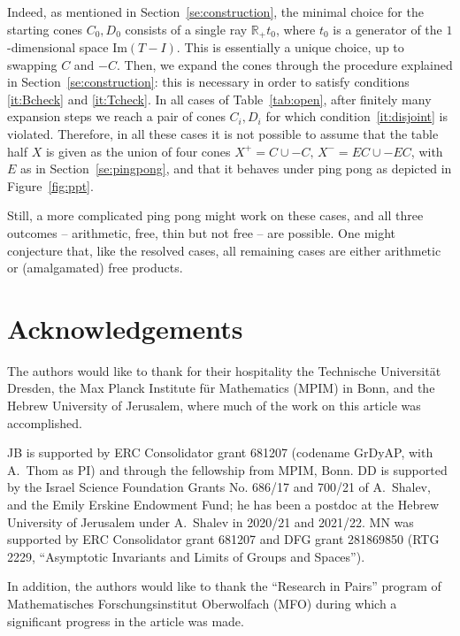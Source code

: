 \documentclass[11pt,a4paper]{amsart}
\theoremstyle{definition}
\theoremstyle{definition}
\numberwithin{equation}{section}
\begin{document}
Indeed, as mentioned in Section~\ref{se:construction}, the minimal choice for the starting cones $C_{0},D_{0}$ consists of a single ray $\mathbb{R}_{+}t_{0}$, where $t_{0}$ is a generator of the $1$-dimensional space $\mathrm{Im}(T-I)$. This is essentially a unique choice, up to swapping $C$ and $-C$. Then, we expand the cones through the procedure explained in Section~\ref{se:construction}: this is necessary in order to satisfy conditions \eqref{it:Bcheck} and \eqref{it:Tcheck}. In all cases of Table~\ref{tab:open}, after finitely many expansion steps we reach a pair of cones $C_{i},D_{i}$ for which condition~\eqref{it:disjoint} is violated. Therefore, in all these cases it is not possible to assume that the table half $X$ is given as the union of four cones $X^+=C\cup -C,\,X^-=EC\cup -EC$, with $E$ as in Section~\ref{se:pingpong}, and that it behaves under ping pong as depicted in Figure~\ref{fig:ppt}.


Still, a more complicated ping pong might work on these cases, and all three outcomes -- arithmetic, free, thin but not free -- are possible. One might conjecture that, like the resolved cases, all remaining cases are either arithmetic or (amalgamated) free products. 


\section*{Acknowledgements}

The authors would like to thank for their hospitality the Technische Universit\"at Dresden, the Max Planck Institute f\"ur Mathematics (MPIM) in Bonn, and the Hebrew University of Jerusalem, where much of the work on this article was accomplished.

JB is supported by ERC Consolidator grant 681207 (codename GrDyAP, with A.~Thom as PI) and through the fellowship from MPIM, Bonn. DD is supported by the Israel Science Foundation Grants No. 686/17 and 700/21 of A.~Shalev, and the Emily Erskine Endowment Fund; he has been a postdoc at the Hebrew University of Jerusalem under A.~Shalev in 2020/21 and 2021/22. MN was supported by ERC Consolidator grant 681207 and DFG grant 281869850 (RTG 2229, ``Asymptotic Invariants and Limits of Groups and Spaces'').

In addition, the authors would like to thank the ``Research in Pairs'' program of Mathematisches Forschungsinstitut Oberwolfach (MFO) during which a significant progress in the  article was made.
\nocite{}


\end{document}
